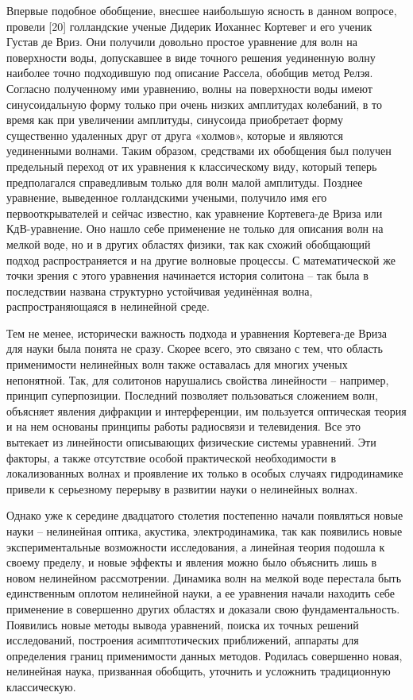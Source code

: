 Впервые подобное обобщение, внесшее наибольшую ясность в данном вопросе, провели [20] голландские ученые Дидерик Иоханнес Кортевег и его ученик Густав де Вриз. Они получили довольно простое уравнение для волн на поверхности воды, допускавшее в виде точного решения уединенную волну наиболее точно подходившую под описание Рассела, обобщив метод Релэя. Согласно полученному ими уравнению, волны на поверхности воды имеют синусоидальную форму только при очень низких амплитудах колебаний, в то время как при увеличении амплитуды, синусоида приобретает форму существенно удаленных друг от друга «холмов», которые и являются уединенными волнами. Таким образом, средствами их обобщения был получен предельный переход от их уравнения к классическому виду, который теперь предполагался справедливым только для волн малой амплитуды.
Позднее уравнение, выведенное голландскими учеными, получило имя его первооткрывателей и сейчас известно, как уравнение Кортевега-де Вриза или КдВ-уравнение. Оно нашло себе применение не только для описания волн на мелкой воде, но и в других областях физики, так как схожий обобщающий подход распространяется и на другие волновые процессы. С математической же точки зрения с этого уравнения начинается история солитона – так была в последствии названа структурно устойчивая уединённая волна, распространяющаяся в нелинейной среде. 

Тем не менее, исторически важность подхода и уравнения Кортевега-де Вриза для науки была понята не сразу. Скорее всего, это связано с тем, что область применимости нелинейных волн также оставалась для многих ученых непонятной. Так, для солитонов нарушались свойства линейности – например, принцип суперпозиции. Последний позволяет пользоваться сложением волн, объясняет явления дифракции и интерференции, им пользуется оптическая теория и на нем основаны принципы работы радиосвязи и телевидения. Все это вытекает из линейности описывающих физические системы уравнений. Эти факторы, а также отсутствие особой практической необходимости в локализованных волнах и проявление их только в особых случаях гидродинамике привели к серьезному перерыву в развитии науки о нелинейных волнах. 

Однако уже к середине двадцатого столетия постепенно начали появляться новые науки – нелинейная оптика, акустика, электродинамика, так как появились новые экспериментальные возможности исследования, а линейная теория подошла к своему пределу, и новые эффекты и явления можно было объяснить лишь в новом нелинейном рассмотрении. Динамика волн на мелкой воде перестала быть единственным оплотом нелинейной науки, а ее уравнения начали находить себе применение в совершенно других областях и доказали свою фундаментальность. Появились новые методы вывода уравнений, поиска их точных решений исследований, построения асимптотических приближений, аппараты для определения границ применимости данных методов. Родилась совершенно новая, нелинейная наука, призванная обобщить, уточнить и усложнить традиционную классическую.

